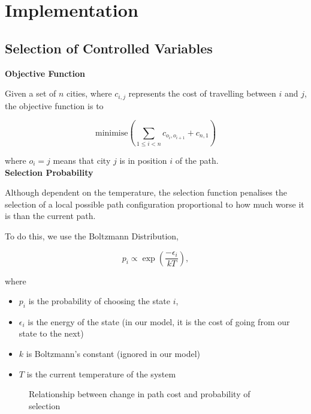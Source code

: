 \documentclass{article}
\begin{document}
\newpage
\section{Implementation}

\subsection{Selection of Controlled Variables}

\textbf{Objective Function}

Given a set of $n$ cities, where $c_{i,j}$ represents the cost of travelling between $i$ and $j$, the objective function is to

$$\text{minimise}\left( \sum_{1 \leq i < n} c_{o_i, o_{i + 1}} + c_{n, 1}\right)$$

where $o_i = j$ means that city $j$ is in position $i$ of the path.
\\

\textbf{Selection Probability}

Although dependent on the temperature, the selection function penalises the selection of a local possible path configuration proportional to how much worse it is than the current path.

To do this, we use the Boltzmann Distribution,

$$p_i \propto \exp \left( \frac{- \epsilon_i}{kT} \right),$$

where
\begin{itemize}
    \item $p_i$ is the probability of choosing the state $i$,
    \item $\epsilon_i$ is the energy of the state (in our model, it is the cost of going from our state to the next)
    \item $k$ is Boltzmann's constant (ignored in our model)
    \item $T$ is the current temperature of the system
\end{itemize}


\begin{figure}[H]
    \centering
    \caption{Relationship between change in path cost and probability of selection}
\end{figure}
\end{document}
